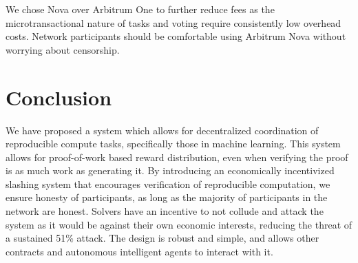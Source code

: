 \documentclass{article}
\begin{document}
We chose Nova over Arbitrum One to further reduce fees as the microtransactional nature of tasks and voting require consistently low overhead costs. Network participants should be comfortable using Arbitrum Nova without worrying about censorship.

\section{Conclusion}

We have proposed a system which allows for decentralized coordination of reproducible compute tasks, specifically those in machine learning. This system allows for proof-of-work based reward distribution, even when verifying the proof is as much work as generating it. By introducing an economically incentivized slashing system that encourages verification of reproducible computation, we ensure honesty of participants, as long as the majority of participants in the network are honest. Solvers have an incentive to not collude and attack the system as it would be against their own economic interests, reducing the threat of a sustained 51\% attack. The design is robust and simple, and allows other contracts and autonomous intelligent agents to interact with it.


\printbibliography

\newpage
\end{document}
